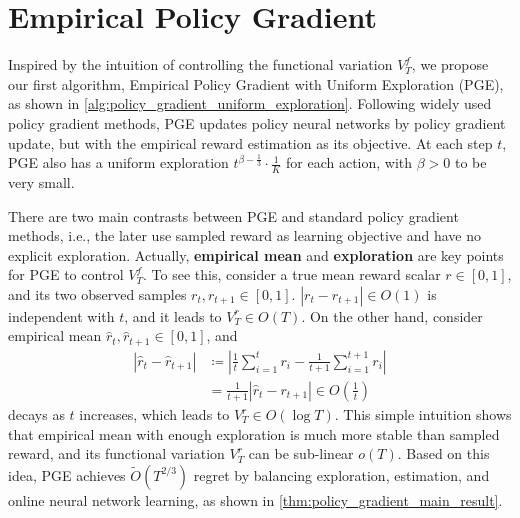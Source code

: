 \section{Empirical Policy Gradient}
\label{sec:policy_gradient}

Inspired by the intuition of controlling the functional variation $V_T^f$, we propose our first algorithm, Empirical Policy Gradient with Uniform Exploration (PGE), as shown in \cref{alg:policy_gradient_uniform_exploration}. Following widely used policy gradient methods, PGE updates policy neural networks by policy gradient update, but with the empirical reward estimation as its objective. At each step $t$, PGE also has a uniform exploration $t^{ \beta - \frac{1}{3}} \cdot \frac{1}{K}$ for each action, with $\beta > 0$ to be very small.

There are two main contrasts between PGE and standard policy gradient methods, i.e., the later use sampled reward as learning objective and have no explicit exploration. Actually, \textbf{empirical mean} and \textbf{exploration} are key points for PGE to control $V_T^f$. To see this, consider a true mean reward scalar $r \in [0, 1]$, and its two observed samples $r_t, r_{t+1} \in [0, 1]$. $\left| r_t - r_{t+1} \right| \in O(1)$ is independent with $t$, and it leads to $V_T^r \in O(T)$. On the other hand, consider empirical mean $\hat{r}_t, \hat{r}_{t+1} \in [0, 1]$, and 
\begin{equation*}
\begin{split}
	\left| \hat{r}_{t} - \hat{r}_{t+1} \right| &\coloneqq \left| \frac{1}{t} \sum_{i=1}^{t}{ r_i } - \frac{1}{t+1} \sum_{i=1}^{t+1}{ r_i } \right| \\
	&= \frac{1}{t+1} \left| \hat{r}_t - r_{t+1} \right| \in O\left(\frac{1}{t}\right)
\end{split}
\end{equation*}
decays as $t$ increases, which leads to $V_T^r \in O(\log{T})$. This simple intuition shows that empirical mean with enough exploration is much more stable than sampled reward, and its functional variation $V_T^r$ can be sub-linear $o(T)$. Based on this idea, PGE achieves $\tilde{O}(T^{2/3})$ regret by balancing exploration, estimation, and online neural network learning, as shown in \cref{thm:policy_gradient_main_result}.

